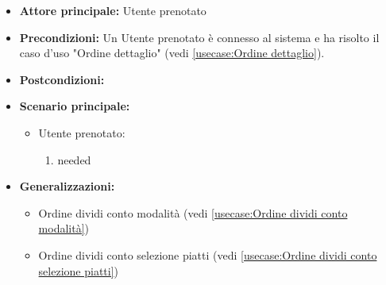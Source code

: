 \label{usecase:Ordine dividi conto}
\begin{itemize}
\item \textbf{Attore principale:} Utente prenotato
\item \textbf{Precondizioni:}
Un Utente prenotato è connesso al sistema e ha risolto il caso d'uso "Ordine dettaglio" (vedi \autoref{usecase:Ordine dettaglio}).
\item \textbf{Postcondizioni:}
\item \textbf{Scenario principale:}
\begin{itemize}
\item Utente prenotato:
\begin{enumerate}
\item needed
\end{enumerate}
\end{itemize}
\item \textbf{Generalizzazioni:}
\begin{itemize}
\item Ordine dividi conto modalità (vedi \autoref{usecase:Ordine dividi conto modalità})\item Ordine dividi conto selezione piatti (vedi \autoref{usecase:Ordine dividi conto selezione piatti})
\end{itemize}
\end{itemize}